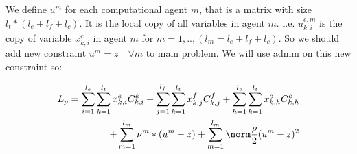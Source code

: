 \documentclass[conference]{IEEEtran}
\begin{document}
    We define $u^m$ for each computational agent $m$, that is a matrix with size $l_t*(l_e+l_f+l_c)$.
    It is the local copy of all variables in agent $m$. i.e. $u_{k,i}^{e,m}$ is the copy of variable $x_{k,i}^e$
    in agent $m$ for $m=1,..,(l_m = l_e+l_f+l_c)$. So we should add new constraint $u^m = z \quad \forall m$ to main problem.
    We will use admm on this new constraint so:

    \begin{subequations}
      \begin{align}
        L_p = \sum_{i=1}^{l_e} \sum_{k=1}^{l_t} x_{k,i}^e C_{k,i}^e
        +\sum_{j=1}^{l_f} \sum_{k=1}^{l_t} x_{k,j}^f C_{k,j}^f
        +\sum_{h=1}^{l_c} \sum_{k=1}^{l_t} x_{k,h}^c C_{k,h}^c \\ \notag
        +\sum_{m=1}^{l_m} \nu^m*(u^m-z) + \sum_{m=1}^{l_m} \norm\frac{\rho}{2} ({u^m-z})^2
      \end{align}
    \end{subequations}







\end{document}
